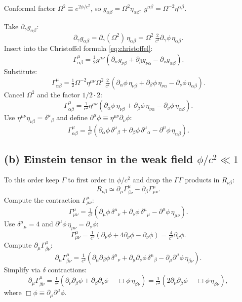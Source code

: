 \documentclass[11pt]{article}
\begin{document}
Conformal factor $\Omega^2\equiv e^{2\phi/c^2}$, so $g_{\alpha\beta}=\Omega^2\eta_{\alpha\beta}$, $g^{\alpha\beta}=\Omega^{-2}\eta^{\alpha\beta}$.

Take $\partial_\gamma g_{\alpha\beta}$:
\[
\partial_\gamma g_{\alpha\beta} = \partial_\gamma(\Omega^2)\,\eta_{\alpha\beta} = \Omega^2\,\tfrac{2}{c^2}\partial_\gamma\phi\,\eta_{\alpha\beta}.
\]
Insert into the Christoffel formula \eqref{eq:christoffel}:
\[
\Gamma^\mu_{\alpha\beta} = \tfrac12 g^{\mu\nu}(\partial_\alpha g_{\nu\beta}+\partial_\beta g_{\nu\alpha}-\partial_\nu g_{\alpha\beta}).
\]
Substitute:
\[
\Gamma^\mu_{\alpha\beta} = \tfrac12\Omega^{-2}\eta^{\mu\nu}\Omega^2\,\tfrac{2}{c^2}\!\left(\partial_\alpha\phi\,\eta_{\nu\beta}+\partial_\beta\phi\,\eta_{\nu\alpha}-\partial_\nu\phi\,\eta_{\alpha\beta}\right).
\]
Cancel $\Omega^2$ and the factor $1/2\cdot 2$:
\[
\Gamma^\mu_{\alpha\beta} = \tfrac{1}{c^2}\eta^{\mu\nu}\!\left(\partial_\alpha\phi\,\eta_{\nu\beta}+\partial_\beta\phi\,\eta_{\nu\alpha}-\partial_\nu\phi\,\eta_{\alpha\beta}\right).
\]
Use $\eta^{\mu\nu}\eta_{\nu\beta}=\delta^\mu{}_\beta$ and define $\partial^\mu\phi\equiv\eta^{\mu\nu}\partial_\nu\phi$:
\begin{equation}
\boxed{\;\Gamma^\mu_{\alpha\beta} = \tfrac{1}{c^2}\!\left(\partial_\alpha\phi\,\delta^\mu{}_\beta + \partial_\beta\phi\,\delta^\mu{}_\alpha - \partial^\mu\phi\,\eta_{\alpha\beta}\right).\;}
\label{eq:Gconf}
\end{equation}

\subsection*{(b) Einstein tensor in the weak field $\phi/c^2\ll 1$}

To this order keep $\Gamma$ to first order in $\phi/c^2$ and drop the $\Gamma\Gamma$ products in $R_{\nu\beta}$:
\[
R_{\nu\beta} \simeq \partial_\mu\Gamma^\mu_{\beta\nu} - \partial_\beta\Gamma^\mu_{\mu\nu}.
\]
Compute the contraction $\Gamma^\mu_{\mu\nu}$:
\[
\Gamma^\mu_{\mu\nu} = \tfrac{1}{c^2}\!\left(\partial_\mu\phi\,\delta^\mu{}_\nu+\partial_\nu\phi\,\delta^\mu{}_\mu - \partial^\mu\phi\,\eta_{\mu\nu}\right).
\]
Use $\delta^\mu{}_\mu=4$ and $\partial^\mu\phi\,\eta_{\mu\nu}=\partial_\nu\phi$:
\[
\Gamma^\mu_{\mu\nu} = \tfrac{1}{c^2}(\partial_\nu\phi+4\partial_\nu\phi-\partial_\nu\phi) = \tfrac{4}{c^2}\partial_\nu\phi.
\]
Compute $\partial_\mu\Gamma^\mu_{\beta\nu}$:
\[
\partial_\mu\Gamma^\mu_{\beta\nu} = \tfrac{1}{c^2}\!\left(\partial_\mu\partial_\beta\phi\,\delta^\mu{}_\nu + \partial_\mu\partial_\nu\phi\,\delta^\mu{}_\beta - \partial_\mu\partial^\mu\phi\,\eta_{\beta\nu}\right).
\]
Simplify via $\delta$ contractions:
\[
\partial_\mu\Gamma^\mu_{\beta\nu} = \tfrac{1}{c^2}\!\left(\partial_\nu\partial_\beta\phi + \partial_\beta\partial_\nu\phi - \Box\phi\,\eta_{\beta\nu}\right) = \tfrac{1}{c^2}\!\left(2\partial_\nu\partial_\beta\phi - \Box\phi\,\eta_{\beta\nu}\right),
\]
where $\Box\phi\equiv\partial_\mu\partial^\mu\phi$.
\end{document}
